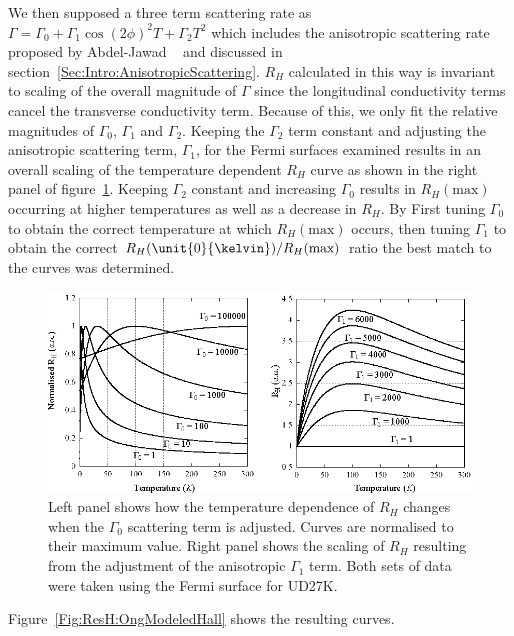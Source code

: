 We then supposed a three term scattering rate  as $\Gamma = \Gamma_0 + \Gamma_1 \cos(2\phi)^2 T + \Gamma_2 T^2$ which includes the anisotropic scattering rate proposed by Abdel-Jawad \etal~\cite{Abdel-Jawad2007} and discussed in section~\ref{Sec:Intro:AnisotropicScattering}. $R_H$ calculated in this way is invariant to scaling of the overall magnitude of $\Gamma$ since the longitudinal conductivity terms cancel the transverse conductivity term. Because of this, we only fit the relative magnitudes of $\Gamma_0$, $\Gamma_1$ and $\Gamma_2$. Keeping the $\Gamma_2$ term constant and adjusting the anisotropic scattering term, $\Gamma_1$, for the Fermi surfaces examined results in an overall scaling of the temperature dependent $R_H$ curve as shown in the right panel of figure~\ref{Fig:ResH:OngBehaviour}. Keeping $\Gamma_2$ constant and increasing $\Gamma_0$ results in $R_H(\textrm{max})$ occurring at higher temperatures as well as a decrease in $R_H$. By First tuning $\Gamma_0$ to obtain the correct temperature at which $R_H(\textrm{max})$ occurs, then tuning $\Gamma_1$ to obtain the correct $R_H(\unit{0}{\kelvin})/R_H(\textrm{max})$ ratio the best match to the curves was determined.
\begin{figure}[htbp]
    \begin{center}
        \includegraphics[scale=1.1]{Chapter-HallBSCO/Figures/OngBehaviour/OngBehaviour}
        \caption{Left panel shows how the temperature dependence of $R_H$ changes when the $\Gamma_0$ scattering term is adjusted. Curves are normalised to their maximum value. Right panel shows the scaling of $R_H$ resulting from the adjustment of the anisotropic $\Gamma_1$ term. Both sets of data were taken using the Fermi surface for UD27K.}
        \label{Fig:ResH:OngBehaviour}
    \end{center}
\end{figure}

Figure~\ref{Fig:ResH:OngModeledHall} shows the resulting curves.


